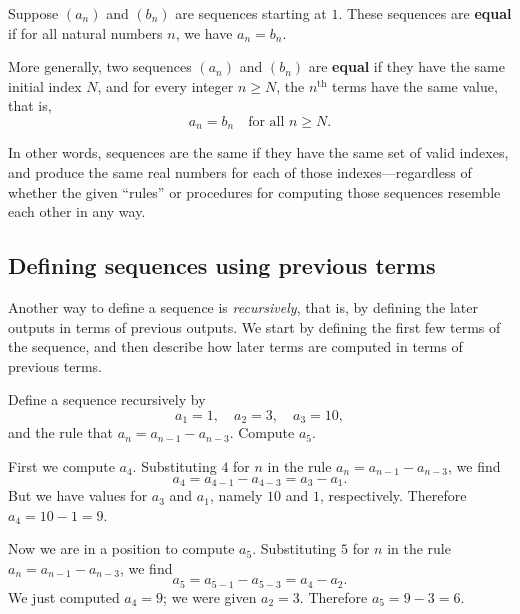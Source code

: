 \documentclass{ximera}
\newcommand{\defnword}[1]{\textbf{#1}}
\newcommand{\nth}{\mbox{th}}
\renewcommand{\index}[1]{}
\begin{document}
\begin{definition}
  Suppose $(a_n)$ and $(b_n)$ are sequences starting at $1$.  These
  sequences are \defnword{equal}\index{sequence!equality} if for all
  natural numbers $n$, we have $a_n = b_n$.

  More generally, two sequences $(a_n)$ and $(b_n)$ are
  \defnword{equal} if they have the same initial index $N$, and for
  every integer $n \geq N$, the $n^{\nth}$ terms have the same value, that is,
  \[
  a_n = b_n \quad \mbox{for all $n \geq N$.}
  \]
\end{definition}
In other words, sequences are the same if they have the same set of
valid indexes, and produce the same real numbers for each of those
indexes---regardless of whether the given ``rules'' or procedures for
computing those sequences resemble each other in any way.

\subsection{Defining sequences using previous terms}
\label{subsection:recursive-definition}

Another way to define a sequence is \textit{recursively}, that is, by
defining the later outputs in terms of previous outputs.  We start by
defining the first few terms of the sequence, and then describe how
later terms are computed in terms of previous terms.

\begin{example}
Define a sequence recursively by
$$
a_1 = 1, \quad a_2 = 3, \quad a_3 = 10,
$$
and the rule that $a_n = a_{n-1} - a_{n-3}$.  Compute $a_5$.
\end{example}

\begin{worked-solution}
  First we compute $a_4$.  Substituting $4$ for $n$ in the rule $a_n = a_{n-1} - a_{n-3}$, we find
$$
a_4 = a_{4-1} - a_{4-3} = a_3 - a_1.
$$
But we have values for $a_3$ and $a_1$, namely $10$ and $1$, respectively.  Therefore $a_4 = 10 - 1 = 9$.

Now we are in a position to compute $a_5$.  Substituting $5$ for $n$ in the rule $a_n = a_{n-1} - a_{n-3}$, we find
$$
a_5 = a_{5-1} - a_{5-3} = a_4 - a_2.
$$
We just computed $a_4 = 9$; we were given $a_2 = 3$.  Therefore $a_5 = 9 - 3 = 6$.
\end{worked-solution}

\end{document}
